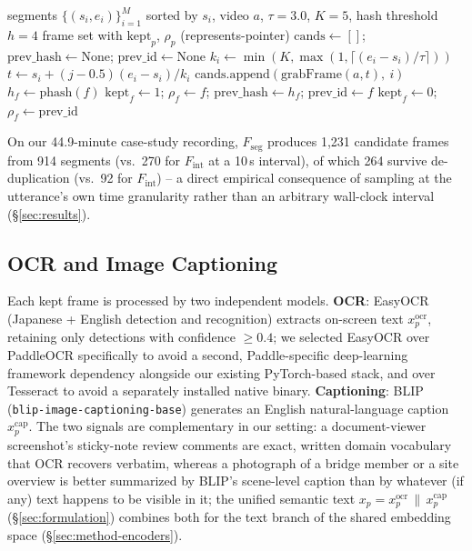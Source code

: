 ﻿\documentclass[twocolumn]{article}
\begin{document}
\begin{algorithm}[t]
\caption{Segment-driven frame sampling with sequential de-duplication}
\label{alg:framesample}
\begin{algorithmic}[1]
\Require segments $\{(s_i,e_i)\}_{i=1}^{M}$ sorted by $s_i$, video $a$, $\tau=3.0$, $K=5$,
  hash threshold $h=4$
\Ensure frame set with $\mathrm{kept}_p$, $\rho_p$ (represents-pointer)
\State $\mathrm{cands} \gets []$; $\mathrm{prev\_hash} \gets \mathrm{None}$; $\mathrm{prev\_id}
  \gets \mathrm{None}$
  \State $k_i \gets \min(K, \max(1, \lceil (e_i-s_i)/\tau \rceil))$ 
    \State $t \gets s_i + (j{-}0.5)(e_i{-}s_i)/k_i$
    \State $\mathrm{cands.append}(\mathrm{grabFrame}(a, t),\ i)$
  \EndFor
\EndFor
{} 
  \State $h_f \gets \mathrm{phash}(f)$
    \State $\mathrm{kept}_f \gets 1$; $\rho_f \gets f$; $\mathrm{prev\_hash} \gets h_f$;
      $\mathrm{prev\_id} \gets f$
  \Else
    \State $\mathrm{kept}_f \gets 0$; $\rho_f \gets \mathrm{prev\_id}$
  \EndIf
\EndFor
\end{algorithmic}
\end{algorithm}

On our 44.9-minute case-study recording, $F_{\text{seg}}$ produces 1{,}231 candidate frames from 914
segments (vs.\ 270 for $F_{\text{int}}$ at a 10\,s interval), of which 264 survive de-duplication (vs.\
92 for $F_{\text{int}}$) -- a direct empirical consequence of sampling at the utterance's own time
granularity rather than an arbitrary wall-clock interval (\S\ref{sec:results}).

\subsection{OCR and Image Captioning}
\label{sec:method-ocr}

Each kept frame is processed by two independent models. \textbf{OCR}: EasyOCR~\cite{jaided2020easyocr}
(Japanese + English detection and recognition) extracts on-screen text $x^{\text{ocr}}_p$, retaining
only detections with confidence $\geq 0.4$; we selected EasyOCR over PaddleOCR specifically to avoid
a second, Paddle-specific deep-learning framework dependency alongside our existing PyTorch-based
stack, and over Tesseract to avoid a separately installed native binary. \textbf{Captioning}:
BLIP~\cite{li2022blip} (\texttt{blip-image-captioning-base}) generates an English natural-language
caption $x^{\text{cap}}_p$. The two signals are complementary in our setting: a document-viewer
screenshot's sticky-note review comments are exact, written domain vocabulary that OCR recovers
verbatim, whereas a photograph of a bridge member or a site overview is better summarized by BLIP's
scene-level caption than by whatever (if any) text happens to be visible in it; the unified semantic
text $x_p = x^{\text{ocr}}_p \,\|\, x^{\text{cap}}_p$ (\S\ref{sec:formulation}) combines both for the
text branch of the shared embedding space (\S\ref{sec:method-encoders}).
\end{document}
